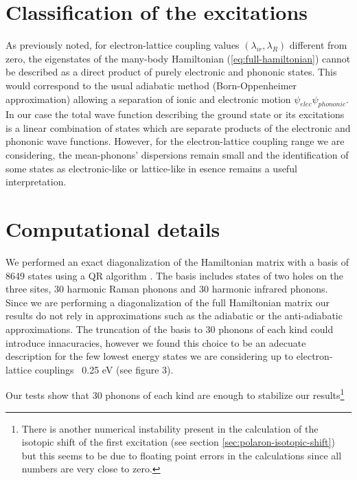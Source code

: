 \section{Classification of the excitations}
\label{sec:classification}


As previously noted, for electron-lattice coupling values $(\lambda_{ir},\lambda_R)$ different from zero, the eigenstates of the many-body Hamiltonian (\ref{eq:full-hamiltonian}) cannot be described as a direct product of purely electronic and phononic states. 
This would correspond to the usual adiabatic method (Born-Oppenheimer approximation) allowing a separation of ionic and electronic motion $\psi_{elec}\psi_{phononic}$. 
In our case the total wave function describing the ground state or its excitations is a linear combination of states which are separate products of the electronic and phononic wave functions. 
However, for the electron-lattice coupling range we are considering, the mean-phonons' dispersions remain small and the identification of some states as electronic-like or lattice-like in esence remains a useful interpretation.


\section{Computational details}
\label{sec:comp_details}


We performed an exact diagonalization of the Hamiltonian matrix with a basis of 8649 states using a QR algorithm \cite{eigenweb}. 
The basis includes states of two holes on the three sites, 30 harmonic Raman phonons and 30 harmonic infrared phonons. 
Since we are performing a diagonalization of the full Hamiltonian matrix our results do not rely in approximations such as the adiabatic or the anti-adiabatic approximations. 
The  truncation of the basis to 30 phonons of each kind could introduce innacuracies, however we found this choice to be an adecuate description for the few lowest energy states we are considering up to electron-lattice couplings ~0.25 eV (see figure 3).

Our tests show that 30 phonons of each kind are enough to stabilize our results\footnote{There is another numerical instability present in the calculation of the isotopic shift of the first excitation (see section \ref{sec:polaron-isotopic-shift}) but this seems to be due to floating point errors in the calculations since all numbers are very close to zero.}
